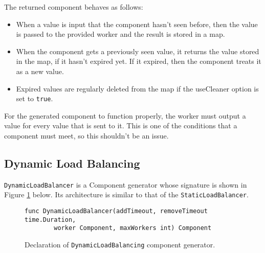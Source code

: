 The returned component behaves as follows:
\begin{itemize}
	\item When a value is input that the component hasn't seen before, then
		  the value is passed to the provided worker and the result is stored in
		  a map.
	\item When the component gets a previously seen value, it returns the value
		  stored in the map, if it hasn't expired yet. If it expired, then the component
		  treats it as a new value.
	\item Expired values are regularly deleted from the map if the useCleaner
          option is set to \texttt{true}.
\end{itemize}

For the generated component to function properly, the worker must output
a value for every value that is sent to it. This is one of the conditions
that a component must meet, so this shouldn't be an issue.

\subsection{Dynamic Load Balancing}
\texttt{DynamicLoadBalancer} is a Component generator whose signature is
shown in Figure \ref{fig:loadComp} below. Its architecture is similar
to that of the \texttt{StaticLoadBalancer}.
\begin{figure}[h]
\centering
\begin{lstlisting}
func DynamicLoadBalancer(addTimeout, removeTimeout time.Duration, 
        worker Component, maxWorkers int) Component
\end{lstlisting}
\caption[scale=1.0]{Declaration of \texttt{DynamicLoadBalancing} 
component generator.}
\label{fig:loadComp}
\end{figure}

